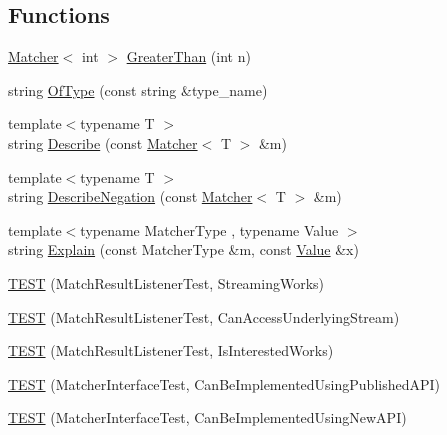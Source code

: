 \subsection*{Functions}
\begin{DoxyCompactItemize}
\item 
\hyperlink{classtesting_1_1Matcher}{Matcher}$<$ int $>$ \hyperlink{namespacetesting_1_1gmock__matchers__test_a8cf8614a7c9adc8fb00e8af04895f97c}{Greater\+Than} (int n)
\item 
string \hyperlink{namespacetesting_1_1gmock__matchers__test_a5d48d2ef7ca374de369c5f0a30e32343}{Of\+Type} (const string \&type\+\_\+name)
\item 
{\footnotesize template$<$typename T $>$ }\\string \hyperlink{namespacetesting_1_1gmock__matchers__test_a36ae44e4f6c8e9fe3fe9162132503717}{Describe} (const \hyperlink{classtesting_1_1Matcher}{Matcher}$<$ T $>$ \&m)
\item 
{\footnotesize template$<$typename T $>$ }\\string \hyperlink{namespacetesting_1_1gmock__matchers__test_afbc8022da5a58aa467ec414ab3e90908}{Describe\+Negation} (const \hyperlink{classtesting_1_1Matcher}{Matcher}$<$ T $>$ \&m)
\item 
{\footnotesize template$<$typename Matcher\+Type , typename Value $>$ }\\string \hyperlink{namespacetesting_1_1gmock__matchers__test_a6215aeb6213a03f4233924ef1c74d968}{Explain} (const Matcher\+Type \&m, const \hyperlink{namespacetesting_ae44c50a3a7f0a46f05c8a0b0592b4a62}{Value} \&x)
\item 
\hyperlink{namespacetesting_1_1gmock__matchers__test_a7bc21ec910c3861034d1336fecfcc260}{T\+E\+ST} (Match\+Result\+Listener\+Test, Streaming\+Works)
\item 
\hyperlink{namespacetesting_1_1gmock__matchers__test_abc02b215e80c57464c83abdf297b9db7}{T\+E\+ST} (Match\+Result\+Listener\+Test, Can\+Access\+Underlying\+Stream)
\item 
\hyperlink{namespacetesting_1_1gmock__matchers__test_ac7ee3826ca24c20fa2a8b388c72eedb2}{T\+E\+ST} (Match\+Result\+Listener\+Test, Is\+Interested\+Works)
\item 
\hyperlink{namespacetesting_1_1gmock__matchers__test_a2d73acaddb6b28a827ce0e475ffc9cde}{T\+E\+ST} (Matcher\+Interface\+Test, Can\+Be\+Implemented\+Using\+Published\+A\+PI)
\item 
\hyperlink{namespacetesting_1_1gmock__matchers__test_ad212c5ac3ef7a102a6b1712e40e06a1e}{T\+E\+ST} (Matcher\+Interface\+Test, Can\+Be\+Implemented\+Using\+New\+A\+PI)

\end{DoxyCompactItemize}
